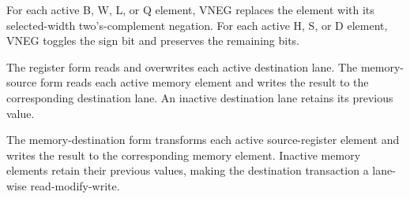 For each active B, W, L, or Q element, VNEG replaces the element with its
selected-width two's-complement negation. For each active H, S, or D element,
VNEG toggles the sign bit and preserves the remaining bits.

The register form reads and overwrites each active destination lane. The
memory-source form reads each active memory element and writes the result to the
corresponding destination lane. An inactive destination lane retains its
previous value.

The memory-destination form transforms each active source-register element and
writes the result to the corresponding memory element. Inactive memory elements
retain their previous values, making the destination transaction a lane-wise
read-modify-write.
